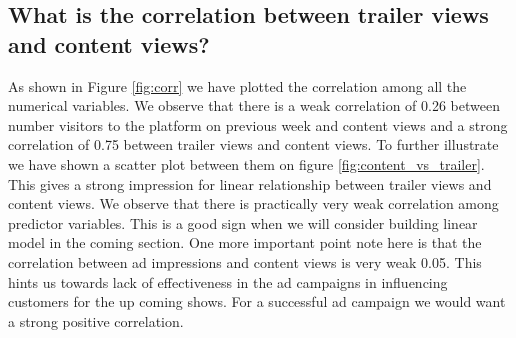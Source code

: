 \documentclass[12pt,a4paper]{style}
\begin{document}
\subsection{What is the correlation between trailer views and content views?}
As shown in Figure \ref{fig:corr} we have plotted the correlation among all the numerical variables. We observe that there is a weak correlation of 0.26 between number visitors to the platform on previous week and content views and a strong correlation of 0.75 between trailer views and content views. To further illustrate we have shown a scatter plot between them on figure \ref{fig:content_vs_trailer}. This gives a strong impression for linear relationship between trailer views and content views. We observe that there is practically very weak correlation among predictor variables. This is a good sign when we will consider building linear model in the coming section. One more important point note here is that the correlation between ad impressions and content views is very weak 0.05. This hints us towards lack of effectiveness in the ad campaigns in influencing customers for the up coming shows. For a successful ad campaign we would want a strong positive correlation.
\end{document}

